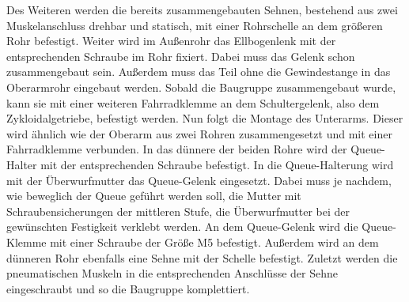 Des Weiteren werden die bereits zusammengebauten Sehnen, bestehend aus zwei Muskelanschluss drehbar und statisch, mit einer Rohrschelle an dem größeren Rohr befestigt. 
Weiter wird im Außenrohr das Ellbogenlenk mit der entsprechenden Schraube im Rohr fixiert. 
Dabei muss das Gelenk schon zusammengebaut sein. 
Außerdem muss das Teil ohne die Gewindestange in das Oberarmrohr eingebaut werden.
Sobald die Baugruppe zusammengebaut wurde, kann sie mit einer weiteren Fahrradklemme an dem Schultergelenk, also dem Zykloidalgetriebe, befestigt werden. 
Nun folgt die Montage des Unterarms.
Dieser wird ähnlich wie der Oberarm aus zwei Rohren zusammengesetzt und mit einer Fahrradklemme verbunden. 
In das dünnere der beiden Rohre wird der Queue-Halter mit der entsprechenden Schraube befestigt. In die Queue-Halterung wird mit der Überwurfmutter das Queue-Gelenk eingesetzt. 
Dabei muss je nachdem, wie beweglich der Queue geführt werden soll, die Mutter mit Schraubensicherungen der mittleren Stufe, die Überwurfmutter bei der gewünschten Festigkeit verklebt werden. 
An dem Queue-Gelenk wird die Queue-Klemme mit einer Schraube der Größe M5 befestigt. 
Außerdem wird an dem dünneren Rohr ebenfalls eine Sehne mit der Schelle befestigt. 
Zuletzt werden die pneumatischen Muskeln in die entsprechenden Anschlüsse der Sehne eingeschraubt und so die Baugruppe komplettiert. 